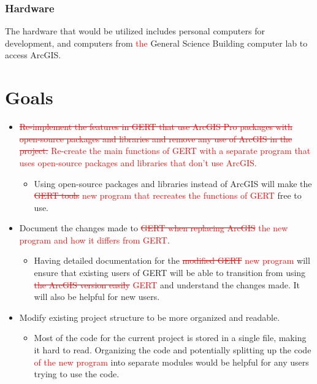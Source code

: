\documentclass{article}
\begin{document}
    \subsubsection{Hardware}
    The hardware that would be utilized includes personal computers for development, and computers from \textcolor{red}{the} General Science Building computer lab to access ArcGIS.


\section{Goals}
\begin{itemize}
    \item \textcolor{red}{\sout{Re-implement the features in GERT that use ArcGIS Pro packages with open-source packages and libraries and remove any use of ArcGIS in the project.} Re-create the main functions of GERT with a separate program that uses open-source packages and libraries that don't use ArcGIS.}
    \begin{itemize}
        \item Using open-source packages and libraries instead of ArcGIS will make the \textcolor{red}{\sout{GERT tools} new program that recreates the functions of GERT} free to use.
    \end{itemize}
    \item Document the changes made to \textcolor{red}{\sout{GERT when replacing ArcGIS} the new program and how it differs from GERT}.
    \begin{itemize}
        \item Having detailed documentation for the \textcolor{red}{\sout{modified GERT} new program} will ensure that existing users of GERT will be able to transition from using \textcolor{red}{\sout{the ArcGIS version easily} GERT} and understand the changes made. It will also be helpful for new users.
    \end{itemize}
    \item Modify existing project structure to be more organized and readable.
    \begin{itemize}
        \item Most of the code for the current project is stored in a single file, making it hard to read. Organizing the code and potentially splitting up the code \textcolor{red}{of the new program} into separate modules would be helpful for any users trying to use the code.
    \end{itemize}
\end{itemize}
\end{document}
